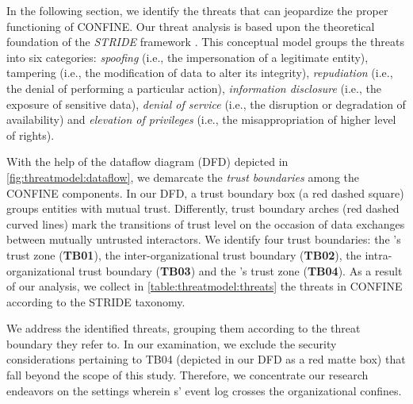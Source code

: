 \begin{newj}
	
In the following section, we identify the threats that can jeopardize the proper functioning of CONFINE. Our threat analysis is based upon the theoretical foundation of the \textit{STRIDE} framework \cite{DBLP:journals/re/ScandariatoWJ15}. This conceptual model groups the threats into six categories: \textit{spoofing} (i.e., the impersonation of a legitimate entity), tampering (i.e., the modification of data to alter its integrity), \textit{repudiation} (i.e., the denial of performing a particular action), \textit{information disclosure} (i.e., the exposure of sensitive data), \textit{denial of service} (i.e., the disruption or degradation of availability) and \textit{elevation of privileges} (i.e., the misappropriation of higher level of rights). 

With the help of the dataflow diagram (DFD) depicted in \cref{fig:threatmodel:dataflow}, we demarcate the \textit{trust boundaries} among the CONFINE components. In our DFD, a trust boundary box (a red dashed square) groups entities with mutual trust. Differently, trust boundary arches (red dashed curved lines) mark the transitions of trust level on the occasion of data exchanges between mutually untrusted interactors. We identify four trust boundaries: the 's trust zone (\textbf{TB01}), the inter-organizational trust boundary (\textbf{TB02}), the intra-organizational trust boundary (\textbf{TB03}) and the 's trust zone (\textbf{TB04}). As a result of our analysis, we collect in \cref{table:threatmodel:threats} the threats in CONFINE according to the STRIDE taxonomy.

We address the identified threats, grouping them according to the threat boundary they refer to. In our examination, we exclude the security considerations pertaining to TB04 (depicted in our DFD as a red matte box) that fall beyond the scope of this study. Therefore, we concentrate our research endeavors on the settings wherein s' event log crosses the organizational confines. 


\end{newj}
